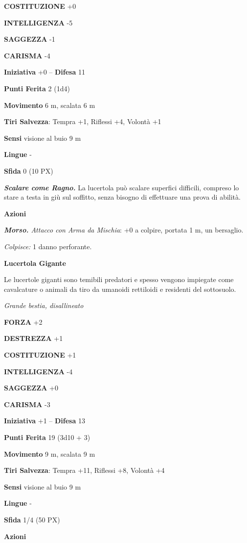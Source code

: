 \begin{multicols}{2}
\textbf{COSTITUZIONE} +0

\textbf{INTELLIGENZA} -5

\textbf{SAGGEZZA} -1

\textbf{CARISMA} -4

\textbf{Iniziativa} +0 -- \textbf{Difesa} 11

\textbf{Punti Ferita} 2 (1d4)

\textbf{Movimento} 6 m, scalata 6 m

\textbf{Tiri Salvezza}: Tempra +1, Riflessi +4, Volontà +1

\textbf{Sensi} visione al buio 9 m

\textbf{Lingue} -

\textbf{Sfida} 0 (10 PX)

\textit{\textbf{Scalare come Ragno.}} La lucertola può scalare superfici difficili, compreso lo stare a testa in giù sul soffitto, senza bisogno di effettuare una prova di abilità.

\textbf{Azioni}

\textit{\textbf{Morso.} Attacco con Arma da Mischia}: +0 a colpire, portata 1 m, un bersaglio.

\textit{Colpisce:} 1 danno perforante.

\medskip\textbf{Lucertola Gigante}

Le lucertole giganti sono temibili predatori e spesso vengono impiegate come cavalcature o animali da tiro da umanoidi rettiloidi e residenti del sottosuolo.

\textit{Grande bestia, disallineato}

\textbf{FORZA} +2

\textbf{DESTREZZA} +1

\textbf{COSTITUZIONE} +1

\textbf{INTELLIGENZA} -4

\textbf{SAGGEZZA} +0

\textbf{CARISMA} -3

\textbf{Iniziativa} +1 -- \textbf{Difesa} 13

\textbf{Punti Ferita} 19 (3d10 + 3)

\textbf{Movimento} 9 m, scalata 9 m

\textbf{Tiri Salvezza}: Tempra +11, Riflessi +8, Volontà +4

\textbf{Sensi} visione al buio 9 m

\textbf{Lingue} -

\textbf{Sfida} 1/4 (50 PX)

\textbf{Azioni}


\end{multicols}
